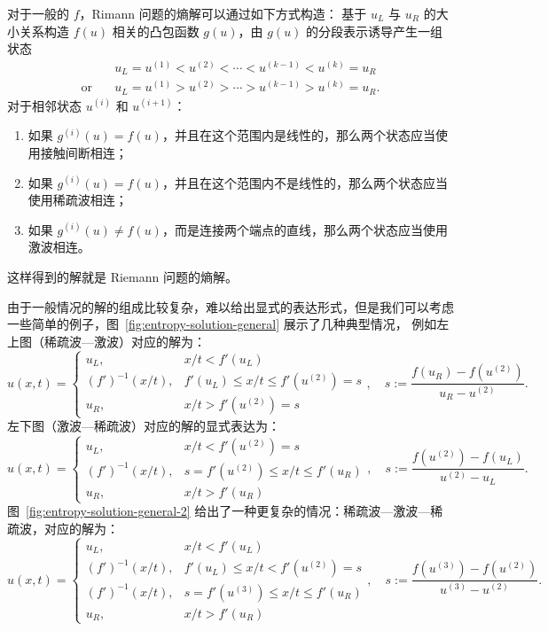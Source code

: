 \begin{theorem}
    对于一般的 $f$，Rimann 问题的熵解可以通过如下方式构造：
    基于 $u_L$ 与 $u_R$ 的大小关系构造 $f(u)$ 相关的凸包函数 $g(u)$，由 $g(u)$ 的分段表示诱导产生一组状态
    \begin{align*}
                       & u_L = u^{(1)} < u^{(2)} < \cdots < u^{(k-1)} < u^{(k)} = u_R \\
        \text{or}\quad & u_L = u^{(1)} > u^{(2)} > \cdots > u^{(k-1)} > u^{(k)} = u_R.
    \end{align*}
    对于相邻状态 $u^{(i)}$ 和 $u^{(i+1)}$：
    \begin{enumerate}
        \item 如果 $g^{(i)}(u) = f(u)$，并且在这个范围内是线性的，那么两个状态应当使用接触间断相连；
        \item 如果 $g^{(i)}(u) = f(u)$，并且在这个范围内不是线性的，那么两个状态应当使用稀疏波相连；
        \item 如果 $g^{(i)}(u) \neq f(u)$，而是连接两个端点的直线，那么两个状态应当使用激波相连。
    \end{enumerate}
    这样得到的解就是 Riemann 问题的熵解。

\end{theorem}

由于一般情况的解的组成比较复杂，难以给出显式的表达形式，但是我们可以考虑一些简单的例子，图~\ref{fig:entropy-solution-general} 展示了几种典型情况，
例如左上图（稀疏波—激波）对应的解为：
\[
    u(x,t) ={}
    \begin{cases}
        u_L,            & x/t < f'(u_L)                       \\
        (f')^{-1}(x/t), & f'(u_L) \le x/t \le f'(u^{(2)}) = s \\
        u_R,            & x/t > f'(u^{(2)}) = s
    \end{cases}
    ,\quad
    s := \frac{f(u_R) - f(u^{(2)})}{u_R - u^{(2)}}.
\]
左下图（激波—稀疏波）对应的解的显式表达为：
\[
    u(x,t) ={}
    \begin{cases}
        u_L,            & x/t < f'(u^{(2)}) = s               \\
        (f')^{-1}(x/t), & s = f'(u^{(2)}) \le x/t \le f'(u_R) \\
        u_R,            & x/t > f'(u_R)
    \end{cases}
    ,\quad
    s := \frac{f(u^{(2)}) - f(u_L)}{u^{(2)} - u_L}.
\]
图~\ref{fig:entropy-solution-general-2} 给出了一种更复杂的情况：稀疏波—激波—稀疏波，对应的解为：
\[
    u(x,t) ={}
    \begin{cases}
        u_L,            & x/t < f'(u_L)                       \\
        (f')^{-1}(x/t), & f'(u_L) \le x/t < f'(u^{(2)}) = s   \\
        (f')^{-1}(x/t), & s = f'(u^{(3)}) \le x/t \le f'(u_R) \\
        u_R,            & x/t > f'(u_R)
    \end{cases}
    ,\quad
    s := \frac{f(u^{(3)}) - f(u^{(2)})}{u^{(3)} - u^{(2)}}.
\]

